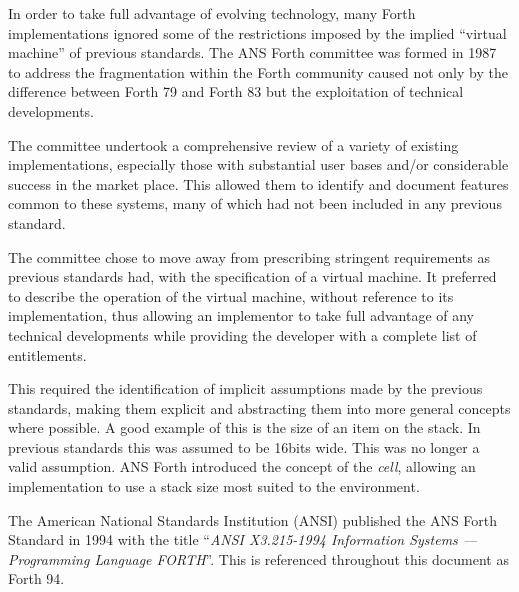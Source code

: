 In order to take full advantage of evolving technology, many Forth
implementations ignored some of the restrictions imposed by the
implied ``virtual machine'' of previous standards.
The ANS Forth committee was formed in 1987 to address the fragmentation
within the Forth community caused not only by the difference between
Forth 79 and Forth 83 but the exploitation of technical developments.

The committee undertook a comprehensive review of a variety of existing
implementations, especially those with substantial user bases and/or
considerable success in the market place.  This allowed them to identify
and document features common to these systems, many of which had not been
included in any previous standard.

The committee chose to move away from prescribing stringent requirements
as previous standards had, with the specification of a virtual machine.
It preferred to describe the operation of the virtual machine, without
reference to its implementation, thus allowing an implementor to take
full advantage of any technical developments while providing the
developer with a complete list of entitlements.

This required the identification of implicit assumptions made by the
previous standards, making them explicit and abstracting them into
more general concepts where possible.  A good example of this is the
size of an item on the stack.  In previous standards this was assumed
to be 16bits wide.  This was no longer a valid assumption.  ANS Forth
introduced the concept of the \emph{cell}, allowing  an implementation
to use a stack size most suited to the environment.


The American National Standards Institution (ANSI) published the ANS
Forth Standard in 1994 with the title ``\emph{ANSI X3.215-1994
Information Systems --- Programming Language FORTH}''.  This is referenced
throughout this document as Forth 94.

